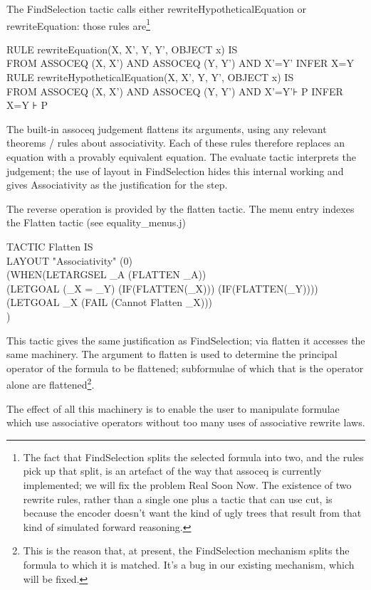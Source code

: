 \documentclass[11pt]{book}
\newcommand{\tab}{\hspace{5mm}}
\begin{document}
The FindSelection tactic calls either rewriteHypotheticalEquation or rewriteEquation: those rules are\footnote{The fact that FindSelection splits the selected formula into two, and the rules pick up that split, is an artefact of the way that assoceq is currently implemented; we will fix the problem Real Soon Now. The existence of two rewrite rules, rather than a single one plus a tactic that can use cut, is because the encoder doesn't want the kind of ugly trees that result from that kind of simulated forward reasoning.}

RULE rewriteEquation(X, X', Y, Y', OBJECT x) IS\\
\tab FROM ASSOCEQ (X, X') AND ASSOCEQ (Y, Y') AND X'=Y' INFER X=Y\\
RULE rewriteHypotheticalEquation(X, X', Y, Y', OBJECT x) IS\\
\tab FROM ASSOCEQ (X, X') AND ASSOCEQ (Y, Y') AND X'=Y'⊦ P INFER X=Y ⊦ P


The built-in assoceq judgement flattens its arguments, using any relevant theorems / rules about associativity. Each of these rules therefore replaces an equation with a provably equivalent equation. The evaluate tactic interprets the judgement; the use of layout in FindSelection hides this internal working and gives Associativity as the justification for the step.


The reverse operation is provided by the flatten tactic. The menu entry indexes the Flatten tactic (see equality\_menus.j)

TACTIC Flatten IS\\
\tab LAYOUT "Associativity" (0)\\
\tab \tab (WHEN\tab (LETARGSEL \_A (FLATTEN \_A))\\
\tab \tab \tab \tab (LETGOAL (\_X = \_Y) (IF(FLATTEN(\_X))) (IF(FLATTEN(\_Y)))) \\
\tab \tab \tab \tab (LETGOAL \_X (FAIL (Cannot Flatten \_X)))\\
\tab \tab )


This tactic gives the same justification as FindSelection; via flatten it accesses the same machinery. The argument to flatten is used to determine the principal operator of the formula to be flattened; subformulae of which that is the operator alone are flattened\footnote{This is the reason that, at present, the FindSelection mechanism splits the formula to which it is matched. It's a bug in our existing mechanism, which will be fixed.}.


The effect of all this machinery is to enable the user to manipulate formulae which use associative operators without too many uses of associative rewrite laws.
\end{document}
